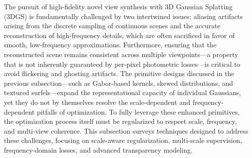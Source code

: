 \documentclass[11pt]{article}
\begin{document}
The pursuit of high-fidelity novel view synthesis with 3D Gaussian Splatting (3DGS) is fundamentally challenged by two intertwined issues: aliasing artifacts arising from the discrete sampling of continuous scenes and the accurate reconstruction of high-frequency details, which are often sacrificed in favor of smooth, low-frequency approximations. Furthermore, ensuring that the reconstructed scene remains consistent across multiple viewpoints---a property that is not inherently guaranteed by per-pixel photometric losses---is critical to avoid flickering and ghosting artifacts. The primitive designs discussed in the previous subsection---such as Gabor-based kernels, skewed distributions, and textured surfels---expand the representational capacity of individual Gaussians, yet they do not by themselves resolve the scale-dependent and frequency-dependent pitfalls of optimization. To fully leverage these enhanced primitives, the optimization process itself must be regularized to respect scale, frequency, and multi-view coherence. This subsection surveys techniques designed to address these challenges, focusing on scale-aware regularization, multi-scale supervision, frequency-domain losses, and advanced transparency modeling.
\end{document}
